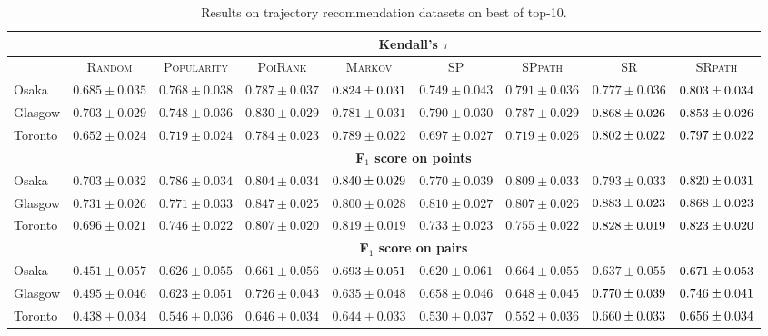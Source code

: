 \begin{table*}[!h]
\centering
\small
\setlength{\tabcolsep}{3pt} %
\begin{tabular}{l|cc|ccc|ccc} \hline
& \multicolumn{8}{c}{\bf Kendall's $\tau$} \\ \hline
 & \textsc{Random} & \textsc{Popularity} & \textsc{PoiRank} & \textsc{Markov} & \textsc{SP} & \textsc{SPpath} & \textsc{SR} & \textsc{SRpath} \\ \hline
Osaka & $0.685\pm0.035$ & $0.768\pm0.038$ & $0.787\pm0.037$ & $\firstBest{0.824\pm0.031}$ & $0.749\pm0.043$ & $0.791\pm0.036$ & $0.777\pm0.036$ & $\secondBest{0.803\pm0.034}$ \\
Glasgow & $0.703\pm0.029$ & $0.748\pm0.036$ & $0.830\pm0.029$ & $0.781\pm0.031$ & $0.790\pm0.030$ & $0.787\pm0.029$ & $\firstBest{0.868\pm0.026}$ & $\secondBest{0.853\pm0.026}$ \\
Toronto & $0.652\pm0.024$ & $0.719\pm0.024$ & $0.784\pm0.023$ & $0.789\pm0.022$ & $0.697\pm0.027$ & $0.719\pm0.026$ & $\firstBest{0.802\pm0.022}$ & $\secondBest{0.797\pm0.022}$ \\
\hline
& \multicolumn{8}{c}{\bf F$_1$ score on points} \\ \hline
Osaka & $0.703\pm0.032$ & $0.786\pm0.034$ & $0.804\pm0.034$ & $\firstBest{0.840\pm0.029}$ & $0.770\pm0.039$ & $0.809\pm0.033$ & $0.793\pm0.033$ & $\secondBest{0.820\pm0.031}$ \\
Glasgow & $0.731\pm0.026$ & $0.771\pm0.033$ & $0.847\pm0.025$ & $0.800\pm0.028$ & $0.810\pm0.027$ & $0.807\pm0.026$ & $\firstBest{0.883\pm0.023}$ & $\secondBest{0.868\pm0.023}$ \\
Toronto & $0.696\pm0.021$ & $0.746\pm0.022$ & $0.807\pm0.020$ & $0.819\pm0.019$ & $0.733\pm0.023$ & $0.755\pm0.022$ & $\firstBest{0.828\pm0.019}$ & $\secondBest{0.823\pm0.020}$ \\
\hline
& \multicolumn{8}{c}{\bf F$_1$ score on pairs} \\ \hline
Osaka & $0.451\pm0.057$ & $0.626\pm0.055$ & $0.661\pm0.056$ & $\firstBest{0.693\pm0.051}$ & $0.620\pm0.061$ & $0.664\pm0.055$ & $0.637\pm0.055$ & $\secondBest{0.671\pm0.053}$ \\
Glasgow & $0.495\pm0.046$ & $0.623\pm0.051$ & $0.726\pm0.043$ & $0.635\pm0.048$ & $0.658\pm0.046$ & $0.648\pm0.045$ & $\firstBest{0.770\pm0.039}$ & $\secondBest{0.746\pm0.041}$ \\
Toronto & $0.438\pm0.034$ & $0.546\pm0.036$ & $0.646\pm0.034$ & $0.644\pm0.033$ & $0.530\pm0.037$ & $0.552\pm0.036$ & $\firstBest{0.660\pm0.033}$ & $\secondBest{0.656\pm0.034}$ \\
\hline
\end{tabular}
\caption{Results on trajectory recommendation datasets on best of top-10.}
\end{table*}
